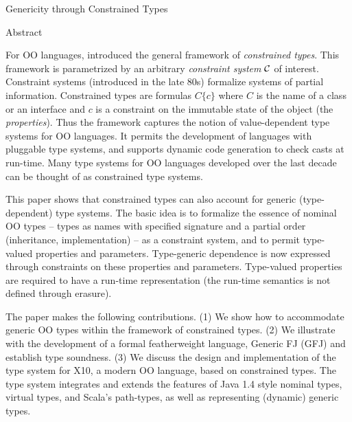 Genericity through Constrained Types

Abstract

For OO languages, \cite{oopsla08} introduced the general framework of
{\em constrained types}. This framework is parametrized by an
arbitrary {\em constraint system} $\cal C$ of interest.  Constraint
systems (introduced in the late 80s) formalize systems of partial
information. Constrained types are formulas $C\{c\}$ where $C$ is the
name of a class or an interface and $c$ is a constraint on the
immutable state of the object (the {\em properties}). Thus the
framework captures the notion of value-dependent type systems for OO
languages. It permits the development of languages with pluggable type
systems, and supports dynamic code generation to check casts at
run-time.  Many type systems for OO languages developed over the last
decade can be thought of as constrained type systems.

This paper shows that constrained types can also account for generic
(type-dependent) type systems. The basic idea is to formalize the
essence of nominal OO types -- types as names with specified signature
and a partial order (inheritance, implementation) -- as a constraint
system, and to permit type-valued properties and
parameters. Type-generic dependence is now expressed through
constraints on these properties and parameters. Type-valued properties
are required to have a run-time representation (the run-time semantics
is not defined through erasure).

The paper makes the following contributions. (1) We show how to
accommodate generic OO types within the framework of constrained
types. (2) We illustrate with the development of a formal
featherweight language, Generic FJ (GFJ) and establish type
soundness. (3) We discuss the design and implementation of the type
system for X10, a modern OO language, based on constrained types. The
type system integrates and extends the features of Java 1.4 style
nominal types, virtual types, and Scala's path-types, as
well as representing (dynamic) generic types.

